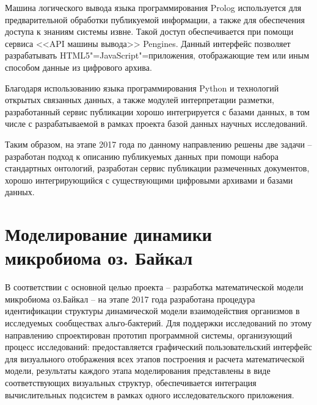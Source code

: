 \documentclass[a4paper,12pt,openany,final]{extreport}
\begin{document}
Машина логического вывода языка программирования Prolog используется для предварительной обработки публикуемой информации, а также для обеспечения доступа к знаниям системы извне. Такой доступ обеспечивается при помощи сервиса <<API машины вывода>> Pengines. Данный интерфейс  позволяет разрабатывать HTML5"=JavaScript"=приложения, отображающие тем или иным способом данные из цифрового архива.

Благодаря использованию языка программирования Python и технологий открытых связанных данных, а также модулей интерпретации разметки, разработанный сервис публикации хорошо интегрируется с базами данных, в том числе с разрабатываемой в рамках проекта базой данных научных исследований.

Таким образом, на этапе 2017 года по данному направлению решены две задачи -- разработан подход к описанию публикуемых данных при помощи набора стандартных онтологий, разработан сервис публикации размеченных документов, хорошо интегрирующийся с существующими цифровыми архивами и базами данных.

\chapter{Моделирование динамики микробиома оз. Байкал}\label{chap:9}

В соответствии с основной целью проекта -- разработка математической
модели микробиома оз.Байкал -- на этапе 2017 года разработана процедура
идентификации структуры динамической модели взаимодействия организмов в
исследуемых сообществах альго-бактерий. Для поддержки исследований по
этому направлению спроектирован прототип программной системы,
организующий процесс исследований: предоставляется графический
пользовательский интерфейс для визуального отображения всех этапов
построения и расчета математической модели, результаты каждого этапа
моделирования представлены в виде соответствующих визуальных структур,
обеспечивается интеграция вычислительных подсистем в рамках одного
исследовательского приложения.
\end{document}
